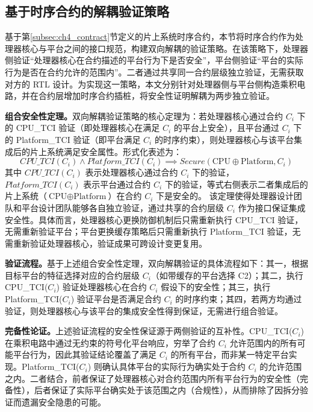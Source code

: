 \subsection{基于时序合约的解耦验证策略}
\label{subsec:ch4_decouple}

基于第\ref{subsec:ch4_contract}节定义的片上系统时序合约，本节将时序合约作为处理器核心与平台之间的接口规范，构建双向解耦的验证策略。在该策略下，处理器侧验证``处理器核心在合约描述的平台行为下是否安全''，平台侧验证``平台的实际行为是否在合约允许的范围内''。二者通过共享同一合约层级独立验证，无需获取对方的 RTL 设计。为实现这一策略，本文分别针对处理器侧与平台侧构造乘积电路，并在合约层增加时序合约插桩，将安全性证明解耦为两步独立验证。

\textbf{组合安全性定理。}双向解耦验证策略的核心定理为：若处理器核心通过合约 $C_i$ 下的 CPU\_TCI 验证（即处理器核心在满足 $C_i$ 的平台上安全），且平台通过 $C_i$ 下的 Platform\_TCI 验证（即平台满足 $C_i$ 的时序约束），则处理器核心与该平台集成后的片上系统满足安全属性。形式化表述为：
\begin{equation}
    \textit{CPU\_TCI}(C_i) \wedge \textit{Platform\_TCI}(C_i) \implies \textit{Secure}(\text{CPU} \oplus \text{Platform}, C_i)
    \label{eq:ch4_compositional}
\end{equation}
其中 $\textit{CPU\_TCI}(C_i)$ 表示处理器核心通过合约 $C_i$ 下的验证，$\textit{Platform\_TCI}(C_i)$ 表示平台通过合约 $C_i$ 下的验证，等式右侧表示二者集成后的片上系统（$\text{CPU} \oplus \text{Platform}$）在合约 $C_i$ 下是安全的。
该定理使得处理器设计团队和平台设计团队能够各自独立验证，通过共享的合约层级 $C_i$ 作为接口保证集成安全性。具体而言，处理器核心更换防御机制后只需重新执行 CPU\_TCI 验证，无需重新验证平台；平台更换缓存策略后只需重新执行 Platform\_TCI 验证，无需重新验证处理器核心，验证成果可跨设计变更复用。

\textbf{验证流程。}基于上述组合安全性定理，双向解耦验证的具体流程如下：其一，根据目标平台的特征选择对应的合约层级 $C_i$（如带缓存的平台选择 C2）；其二，执行 CPU\_TCI($C_i$) 验证处理器核心在合约 $C_i$ 假设下的安全性；其三，执行 Platform\_TCI($C_i$) 验证平台是否满足合约 $C_i$ 的时序约束；其四，若两方均通过验证，则处理器核心与该平台的集成安全性得到保证，无需进行组合验证。

\textbf{完备性论证。}上述验证流程的安全性保证源于两侧验证的互补性。CPU\_TCI($C_i$) 在乘积电路中通过无约束的符号化平台响应，穷举了合约 $C_i$ 允许范围内的所有可能平台行为，因此其验证结论覆盖了满足 $C_i$ 的所有平台，而非某一特定平台实现。Platform\_TCI($C_i$) 则确认具体平台的实际行为确实处于合约 $C_i$ 的允许范围之内。二者结合，前者保证了处理器核心对合约范围内所有平台行为的安全性（完备性），后者保证了实际平台确实处于该范围之内（合规性），从而排除了因拆分验证而遗漏安全隐患的可能。

